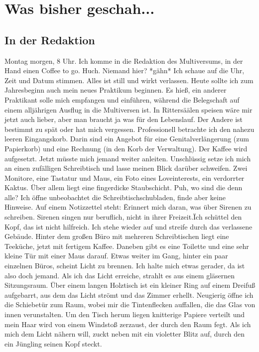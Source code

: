 \documentclass[final]{multiversum}
\begin{document}
\makemultititle
%

\section{Was bisher geschah...}

\subsection{In der Redaktion}
Montag morgen, 8 Uhr. 
Ich komme in die Redaktion des Multiversums, in der Hand einen Coffee to go.
Huch. Niemand hier? *gähn*
Ich schaue auf die Uhr, Zeit und Datum stimmen.
Alles ist still und wirkt verlassen.
Heute sollte ich zum Jahresbeginn auch mein neues Praktikum beginnen.
Es hieß, ein anderer Praktikant solle mich empfangen und einführen, während die Belegschaft auf einem alljährigen Ausflug in die Multiversen ist.
In Rittersäälen speisen wäre mir jetzt auch lieber, aber man braucht ja was für den Lebenslauf.
Der Andere ist bestimmt zu spät oder hat mich vergessen.
Professionell betrachte ich den nahezu leeren Eingangskorb.
Darin sind ein Angebot für eine Genitalverlängerung (zum Papierkorb) und eine Rechnung (in den Korb der Verwaltung).
Der Kaffee wird aufgesetzt.
Jetzt müsste mich jemand weiter anleiten.
Unschlüssig setze ich mich an einen zufälligen Schreibtisch und lasse meinen Blick darüber schweifen.
Zwei Monitore, eine Tastatur und Maus, ein Foto eines Loveinterests, ein verdorrter Kaktus.
Über allem liegt eine fingerdicke Staubschicht.
Puh, wo sind die denn alle?
Ich öffne unbeobachtet die Schreibtischschubladen, finde aber keine Hinweise.
Auf einem Notizzettel steht: \"Erinnert mich daran, was über Sirenen zu schreiben. Sirenen singen nur beruflich, nicht in ihrer Freizeit.\"
Ich schüttel den Kopf, das ist nicht hilfreich.
Ich stehe wieder auf und streife durch das verlassene Gebäude.
Hinter dem großen Büro mit mehreren Schreibtischen liegt eine Teeküche, jetzt mit fertigem Kaffee.
Daneben gibt es eine Toilette und eine sehr kleine Tür mit einer Maus darauf.
Etwas weiter im Gang, hinter ein paar einzelnen Büros, scheint Licht zu brennen.
Ich halte mich etwas gerader, da ist also doch jemand.
Als ich das Licht erreiche, strahlt es aus einem gläsernen Sitzungsraum.
Über einem langen Holztisch ist ein kleiner Ring auf einem Dreifuß aufgebarrt, aus dem das Licht strömt und das Zimmer erhellt.
Neugierig öffne ich die Schiebetür zum Raum, wobei mir die Tintenflecken auffallen, die das Glas von innen verunstalten.
Um den Tisch herum liegen knitterige Papiere verteilt und mein Haar wird von einem Windstoß zerzaust, der durch den Raum fegt.
Als ich mich dem Licht nähern will, zuckt neben mit ein violetter Blitz auf, durch den ein Jüngling seinen Kopf steckt.
\end{document}
